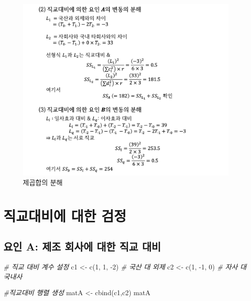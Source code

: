 \documentclass[
]{book}
\newenvironment{Shaded}{\begin{snugshade}}{\end{snugshade}}
\newcommand{\CommentTok}[1]{\textcolor[rgb]{0.56,0.35,0.01}{\textit{#1}}}
\newcommand{\DecValTok}[1]{\textcolor[rgb]{0.00,0.00,0.81}{#1}}
\newcommand{\FunctionTok}[1]{\textcolor[rgb]{0.00,0.00,0.00}{#1}}
\newcommand{\NormalTok}[1]{#1}
\newcommand{\OtherTok}[1]{\textcolor[rgb]{0.56,0.35,0.01}{#1}}
\newcommand{\SpecialCharTok}[1]{\textcolor[rgb]{0.00,0.00,0.00}{#1}}
\begin{document}
\begin{figure}
\centering
\includegraphics{slide03.png}
\caption{제곱합의 분해}
\end{figure}

\newpage

\hypertarget{uxc9c1uxad50uxb300uxbe44uxc5d0-uxb300uxd55c-uxac80uxc815}{%
\section{직교대비에 대한 검정}\label{uxc9c1uxad50uxb300uxbe44uxc5d0-uxb300uxd55c-uxac80uxc815}}

\hypertarget{uxc694uxc778-a-uxc81cuxc870-uxd68cuxc0acuxc5d0-uxb300uxd55c-uxc9c1uxad50-uxb300uxbe44}{%
\subsection{요인 A: 제조 회사에 대한 직교 대비}\label{uxc694uxc778-a-uxc81cuxc870-uxd68cuxc0acuxc5d0-uxb300uxd55c-uxc9c1uxad50-uxb300uxbe44}}

\begin{Shaded}
\begin{Highlighting}[]
\CommentTok{\# 직교 대비 계수 설정}
\NormalTok{c1 }\OtherTok{\textless{}{-}} \FunctionTok{c}\NormalTok{(}\DecValTok{1}\NormalTok{, }\DecValTok{1}\NormalTok{, }\SpecialCharTok{{-}}\DecValTok{2}\NormalTok{) }\CommentTok{\# 국산 대 외제}
\NormalTok{c2 }\OtherTok{\textless{}{-}} \FunctionTok{c}\NormalTok{(}\DecValTok{1}\NormalTok{, }\SpecialCharTok{{-}}\DecValTok{1}\NormalTok{, }\DecValTok{0}\NormalTok{) }\CommentTok{\# 자사 대 국내사}

\CommentTok{\#직교대비 행렬 생성  }
\NormalTok{matA }\OtherTok{\textless{}{-}} \FunctionTok{cbind}\NormalTok{(c1,c2)}
\NormalTok{matA}
\end{Highlighting}
\end{Shaded}
\end{document}

